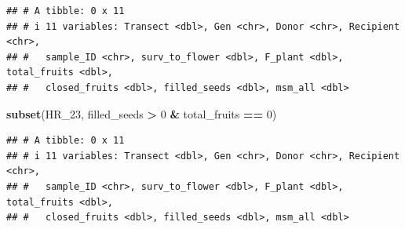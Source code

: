 \documentclass[
]{article}
\newenvironment{Shaded}{\begin{snugshade}}{\end{snugshade}}
\newcommand{\DecValTok}[1]{\textcolor[rgb]{0.00,0.00,0.81}{#1}}
\newcommand{\DocumentationTok}[1]{\textcolor[rgb]{0.56,0.35,0.01}{\textbf{\textit{#1}}}}
\newcommand{\FunctionTok}[1]{\textcolor[rgb]{0.13,0.29,0.53}{\textbf{#1}}}
\newcommand{\NormalTok}[1]{#1}
\newcommand{\OtherTok}[1]{\textcolor[rgb]{0.56,0.35,0.01}{#1}}
\newcommand{\SpecialCharTok}[1]{\textcolor[rgb]{0.81,0.36,0.00}{\textbf{#1}}}
\begin{document}
\begin{Shaded}
\end{Shaded}

\begin{verbatim}
## # A tibble: 0 x 11
## # i 11 variables: Transect <dbl>, Gen <chr>, Donor <chr>, Recipient <chr>,
## #   sample_ID <chr>, surv_to_flower <dbl>, F_plant <dbl>, total_fruits <dbl>,
## #   closed_fruits <dbl>, filled_seeds <dbl>, msm_all <dbl>
\end{verbatim}

\begin{Shaded}
\begin{Highlighting}[]
\FunctionTok{subset}\NormalTok{(HR\_23, filled\_seeds }\SpecialCharTok{\textgreater{}} \DecValTok{0} \SpecialCharTok{\&}\NormalTok{ total\_fruits }\SpecialCharTok{==} \DecValTok{0}\NormalTok{)}
\end{Highlighting}
\end{Shaded}

\begin{verbatim}
## # A tibble: 0 x 11
## # i 11 variables: Transect <dbl>, Gen <chr>, Donor <chr>, Recipient <chr>,
## #   sample_ID <chr>, surv_to_flower <dbl>, F_plant <dbl>, total_fruits <dbl>,
## #   closed_fruits <dbl>, filled_seeds <dbl>, msm_all <dbl>
\end{verbatim}
\end{document}
